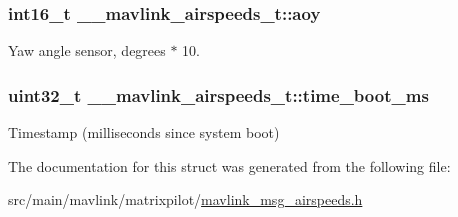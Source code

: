 \hypertarget{struct____mavlink__airspeeds__t_a47779b6c3840ed875177d4040cde33c6}{
\subsubsection[{aoy}]{\setlength{\rightskip}{0pt plus 5cm}int16\+\_\+t \+\_\+\+\_\+mavlink\+\_\+airspeeds\+\_\+t\+::aoy}}\label{struct____mavlink__airspeeds__t_a47779b6c3840ed875177d4040cde33c6}


Yaw angle sensor, degrees $\ast$ 10. 

\hypertarget{struct____mavlink__airspeeds__t_a04c766b6cdea91c8918ed3ec8c2e347c}{
\subsubsection[{time\+\_\+boot\+\_\+ms}]{\setlength{\rightskip}{0pt plus 5cm}uint32\+\_\+t \+\_\+\+\_\+mavlink\+\_\+airspeeds\+\_\+t\+::time\+\_\+boot\+\_\+ms}}\label{struct____mavlink__airspeeds__t_a04c766b6cdea91c8918ed3ec8c2e347c}


Timestamp (milliseconds since system boot) 



The documentation for this struct was generated from the following file\+:\begin{DoxyCompactItemize}
\item 
src/main/mavlink/matrixpilot/\hyperlink{mavlink__msg__airspeeds_8h}{mavlink\+\_\+msg\+\_\+airspeeds.\+h}\end{DoxyCompactItemize}
